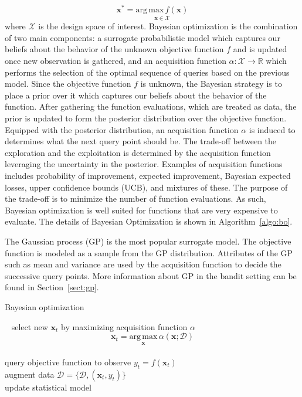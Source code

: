 \documentclass{article}
\begin{document}
\begin{equation}
  \mathbf{x}^* = \underset{\mathbf{x} \in \mathcal{X}}{\mathrm{arg \,
      max} \, f(\mathbf{x})}
\end{equation}
where $\mathcal{X}$ is the design space of interest. Bayesian optimization is the combination of two main
components: a surrogate probabilistic model which captures our beliefs
about the behavior of the unknown objective function $f$ and is updated
once new observation is gathered, and an acquisition function $\alpha: \mathcal{X} \rightarrow \mathbb{R}$ which performs the selection
of the optimal sequence of queries based on the previous model. Since
the objective function $f$ is unknown, the Bayesian
strategy is to place a prior over it which captures our beliefs about the behavior of the
function. After gathering the function evaluations, which are treated
as data, the prior is updated to form the posterior distribution
over the objective function. Equipped with the posterior distribution,
an acquisition function $\alpha$
is induced to determines what the
next query point should be. The trade-off between the exploration and
the exploitation is determined by the acquisition function leveraging the
uncertainty in the posterior. Examples of acquisition functions includes
probability of improvement, expected improvement, Bayesian expected
losses, upper confidence bounds (UCB), and mixtures
of these. The purpose of the trade-off is to
minimize the number of function evaluations. As such, Bayesian
optimization is well suited for functions that are very expensive to
evaluate. The details of Bayesian
Optimization is shown in Algorithm~\ref{algo:bo}.

The Gaussian process (GP) is the most popular surrogate model. The
objective function is modeled as a sample from the GP distribution. Attributes of the
GP such as mean and variance are used by the acquisition function to
decide the successive query points. More information about GP in the
bandit setting can be found in Section~\ref{sect:gp}.

\begin{algorithm}[h]

 \caption{Bayesian optimization}~\label{algo:bo}
  {
   select new $\mathbf{x}_{t}$ by maximizing acquisition function
   $\alpha$
   $$
     \mathbf{x}_{t} = \underset{\mathbf{x}}{\mathrm{arg \, max}} \, \alpha(\mathbf{x};\mathcal{D})
     $$\\
     query objective function to observe $y_{t} =
     f(\mathbf{x}_{t})$ \\
     augment data $\mathcal{D}=\{ \mathcal{D},
     (\mathbf{x}_{t}, y_{t}) \}$\\
     update statistical model
 }
\end{algorithm}
\end{document}

